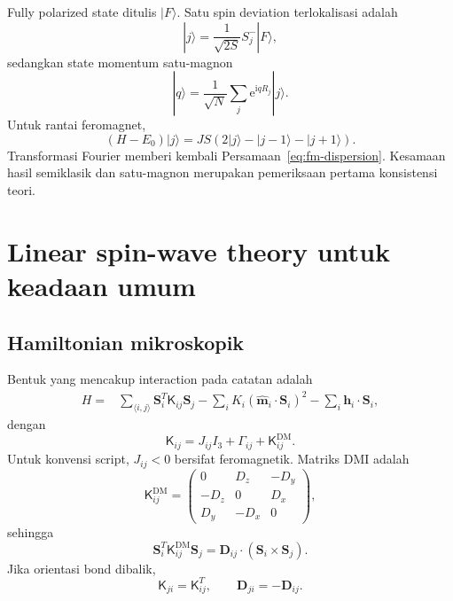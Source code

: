 \documentclass[11pt,a4paper]{article}
\newcommand{\ii}{\mathrm{i}}
\newcommand{\ee}{\mathrm{e}}
\newcommand{\vS}{\bm S}
\newcommand{\vD}{\bm D}
\begin{document}
Fully polarized state ditulis $|F\rangle$. Satu spin deviation terlokalisasi adalah
\begin{equation}
|j\rangle=\frac1{\sqrt{2S}}S_j^-|F\rangle,
\end{equation}
sedangkan state momentum satu-magnon
\begin{equation}
|q\rangle
=\frac1{\sqrt N}\sum_j\ee^{\ii qR_j}|j\rangle.
\end{equation}
Untuk rantai feromagnet,
\begin{equation}
(H-E_0)|j\rangle
=JS(2|j\rangle-|j-1\rangle-|j+1\rangle).
\end{equation}
Transformasi Fourier memberi kembali Persamaan~\eqref{eq:fm-dispersion}. Kesamaan hasil semiklasik dan satu-magnon merupakan pemeriksaan pertama konsistensi teori.

\section{Linear spin-wave theory untuk keadaan umum}

\subsection{Hamiltonian mikroskopik}

Bentuk yang mencakup interaction pada catatan adalah
\begin{align}
H={}&\sum_{\langle i,j\rangle}
\vS_i^T\mathsf K_{ij}\vS_j
-\sum_iK_i(\widehat{\bm m}_i\cdot\vS_i)^2
-\sum_i\bm h_i\cdot\vS_i,
\label{eq:general-micro}
\end{align}
dengan
\begin{equation}
\mathsf K_{ij}
=J_{ij}I_3+\Gamma_{ij}+\mathsf K_{ij}^{\mathrm{DM}}.
\end{equation}
Untuk konvensi script, $J_{ij}<0$ bersifat feromagnetik. Matriks DMI adalah
\begin{equation}
\mathsf K_{ij}^{\mathrm{DM}}
=\begin{pmatrix}
0&D_z&-D_y\\
-D_z&0&D_x\\
D_y&-D_x&0
\end{pmatrix},
\end{equation}
sehingga
\begin{equation}
\vS_i^T\mathsf K_{ij}^{\mathrm{DM}}\vS_j
=\vD_{ij}\cdot(\vS_i\times\vS_j).
\end{equation}
Jika orientasi bond dibalik,
\begin{equation}
\mathsf K_{ji}=\mathsf K_{ij}^T,
\qquad
\vD_{ji}=-\vD_{ij}.
\end{equation}
\end{document}

